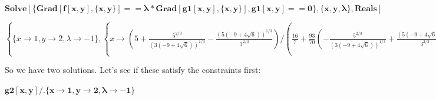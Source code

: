 \begin{doublespace}
\noindent\(\pmb{\text{Solve}[\{\text{Grad}[f[x,y],\{x,y\}]==\lambda *\text{Grad}[\text{g1}[x,y],\{x,y\}],\text{g1}[x,y]==0\},\{x,y,\lambda \},\text{Reals}]}\)
\end{doublespace}

\begin{doublespace}
\noindent\(\left\{\{x\to 1,y\to 2,\lambda \to -1\},\left\{x\to \left(5+\frac{5^{2/3}}{\left(3 \left(-9+4 \sqrt{6}\right)\right)^{1/3}}-\frac{\left(5
\left(-9+4 \sqrt{6}\right)\right)^{1/3}}{3^{2/3}}\right)/\left(\frac{16}{7}+\frac{93}{70} \left(-\frac{5^{2/3}}{\left(3 \left(-9+4 \sqrt{6}\right)\right)^{1/3}}+\frac{\left(5
\left(-9+4 \sqrt{6}\right)\right)^{1/3}}{3^{2/3}}\right)-\frac{29}{28} \left(-\frac{5^{2/3}}{\left(3 \left(-9+4 \sqrt{6}\right)\right)^{1/3}}+\frac{\left(5
\left(-9+4 \sqrt{6}\right)\right)^{1/3}}{3^{2/3}}\right)^2+\frac{137}{280} \left(-\frac{5^{2/3}}{\left(3 \left(-9+4 \sqrt{6}\right)\right)^{1/3}}+\frac{\left(5
\left(-9+4 \sqrt{6}\right)\right)^{1/3}}{3^{2/3}}\right)^3-\frac{23}{175} \left(-\frac{5^{2/3}}{\left(3 \left(-9+4 \sqrt{6}\right)\right)^{1/3}}+\frac{\left(5
\left(-9+4 \sqrt{6}\right)\right)^{1/3}}{3^{2/3}}\right)^4+\frac{17 \left(-\frac{5^{2/3}}{\left(3 \left(-9+4 \sqrt{6}\right)\right)^{1/3}}+\frac{\left(5
\left(-9+4 \sqrt{6}\right)\right)^{1/3}}{3^{2/3}}\right)^5}{1400}\right),y\to -\frac{5^{2/3}}{\left(3 \left(-9+4 \sqrt{6}\right)\right)^{1/3}}+\frac{\left(5
\left(-9+4 \sqrt{6}\right)\right)^{1/3}}{3^{2/3}},\lambda \to -\frac{2}{7}-\frac{93}{70} \left(-\frac{5^{2/3}}{\left(3 \left(-9+4 \sqrt{6}\right)\right)^{1/3}}+\frac{\left(5
\left(-9+4 \sqrt{6}\right)\right)^{1/3}}{3^{2/3}}\right)+\frac{29}{28} \left(-\frac{5^{2/3}}{\left(3 \left(-9+4 \sqrt{6}\right)\right)^{1/3}}+\frac{\left(5
\left(-9+4 \sqrt{6}\right)\right)^{1/3}}{3^{2/3}}\right)^2-\frac{137}{280} \left(-\frac{5^{2/3}}{\left(3 \left(-9+4 \sqrt{6}\right)\right)^{1/3}}+\frac{\left(5
\left(-9+4 \sqrt{6}\right)\right)^{1/3}}{3^{2/3}}\right)^3+\frac{23}{175} \left(-\frac{5^{2/3}}{\left(3 \left(-9+4 \sqrt{6}\right)\right)^{1/3}}+\frac{\left(5
\left(-9+4 \sqrt{6}\right)\right)^{1/3}}{3^{2/3}}\right)^4-\frac{17 \left(-\frac{5^{2/3}}{\left(3 \left(-9+4 \sqrt{6}\right)\right)^{1/3}}+\frac{\left(5
\left(-9+4 \sqrt{6}\right)\right)^{1/3}}{3^{2/3}}\right)^5}{1400}\right\}\right\}\)
\end{doublespace}

So we have two solutions. Let{'}s see if these satisfy the constraints first:

\begin{doublespace}
\noindent\(\pmb{\text{g2}[x,y]\text{/.}\{x\to 1,y\to 2,\lambda \to -1\}}\)
\end{doublespace}

